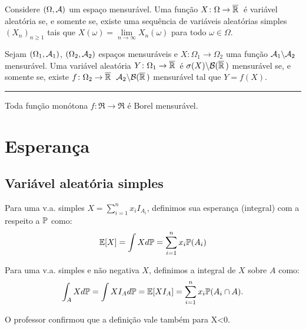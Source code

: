 \begin{corollary}
	Considere $(\Omega, \Acal)$ um espaço mensurável.  Uma função $X\colon\Omega \to \Ree$ é variável aleatória se, e somente se, existe uma sequência de variáveis aleatórias simples $(X_n)_{n\geq1}$ tais que $X(\omega)=\lim\limits_{n\to\infty}X_n(\omega)$ para todo $\omega\in\Omega$.
\end{corollary}

\begin{theorem}
	Sejam $(\Omega_1, \Acal_1)$, $(\Omega_2, \Acal_2)$ espaços mensuráveis e $X\colon\Omega_1 \to \Omega_2$ uma função $\Acal_1\backslash \Acal_2$ mensurável. Uma variável aleatória $Y\colon\Omega_1 \to \Ree$ é $\sigma(X)\backslash \Boe$ mensurável se, e somente se, existe $f\colon\Omega_2 \to \Ree$ $\Acal_2\backslash \Boe$ mensurável tal que $Y=f(X)$.
\end{theorem}

\vspace{1em}
\noindent\rule{\linewidth}{0.4pt}
\vspace{1em}

\begin{theorem}[Exercício 2.5]
	Toda função monótona $f\colon \Re \to \Re$ é Borel mensurável.
\end{theorem}

\section{Esperança}

\subsection{Variável aleatória simples}

\begin{definition}
	Para uma v.a. simples \(X=\sum_{i=1}^{n}x_i I_{A_i}\), definimos sua esperança (integral) com a respeito a $\P$ como:
	\begin{equation}
		\E[X] = \int X d\P = \sum_{i=1}^{n}x_i \P(A_i)
	\end{equation}
\end{definition}

\begin{definition}
	Para uma v.a. simples e não negativa $X$, definimos a integral de $X$ sobre $A$ como:
	\begin{equation}
		\int_A X d\P = \int X I_{A}d\P = \E[X I_{A}] = \sum_{i=1}^{n}x_i \P(A_i\cap A).
	\end{equation}
\begin{note}
	O professor confirmou que a definição vale também para X<0.
\end{note}
\end{definition}

